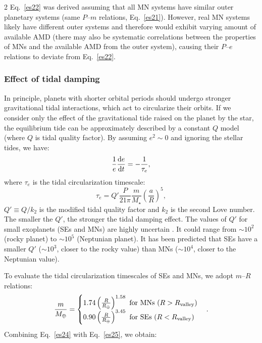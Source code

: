 \documentclass[10pt]{article}
\begin{document}
\begin{multicols}{2}
Eq.~\ref{es22} was derived assuming that all MN systems have similar outer planetary systems (same $P$--$m$ relations, Eq.~\ref{es21}).
However, real MN systems likely have different outer systems and therefore would exhibit varying amount of available AMD (there may also be systematic correlations between the properties of MNs and the available AMD from the outer system), causing their $P$--$e$ relations to deviate from Eq.~\ref{es22}.

\subsubsection*{\hypertarget{s3.3}{Effect of tidal damping}}
\noindent In principle, planets with shorter orbital periods should undergo stronger gravitational tidal interactions, which act to circularize their orbits.
If we consider only the effect of the gravitational tide raised on the planet by the star, the equilibrium tide can be approximately described by a constant $Q$ model (where $Q$ is tidal quality factor).
By assuming $e^2\sim0$ and ignoring the stellar tides, we have\cite{1966Icar....5..375G,2008ApJ...678.1396J}:
\begin{equation}
\label{es23}
{\frac{1}{e}} \frac{{\rm d}e}{{\rm d}t}  = -\frac{1}{\tau_e},
\end{equation}
where $\tau_e$ is the tidal circularization timescale:
\begin{equation}
\label{es24}
\tau_e = Q'{\frac{P}{21\pi}}\frac{m}{M_{\star}}\left({\frac{a}{R}}\right)^5,
\end{equation}
$Q'\equiv Q/k_2$ is the modified tidal quality factor and $k_2$ is the second Love number.
The smaller the $Q'$, the stronger the tidal damping effect.
The values of $Q'$ for small exoplanets (SEs and MNs) are highly uncertain  \cite{2017AJ....153...86M,2018AJ....155..157P,2023ApJ...958L..21L}.
It could range from $\sim 10^2$ (rocky planet)\cite{2016CeMDA.126..145L} to $\sim 10^5$ (Neptunian planet)\cite{2008Icar..193..267Z}.
It has been predicted that SEs have a smaller $Q'$ ($\sim 10^3$, closer to the rocky value) than MNs ($\sim 10^4$, closer to the Neptunian value)\cite{2023ApJ...958L..21L}.

To evaluate the tidal circularization timescales of SEs and MNs, we adopt $m$--$R$ relations\cite{2020A&A...634A..43O}:
\begin{equation}
\label{es25}
\frac{m}{M_\oplus}  =
\begin{cases}
1.74\left(\frac{R}{R_\oplus}\right)^{1.58}~{\rm for~MNs}  ~(R>R_{\rm  valley}) \\
0.90\left(\frac{R}{R_\oplus}\right)^{3.45}~{\rm for~SEs} ~(R<R_{\rm  valley})
\end{cases}
.
\end{equation}
Combining Eq.~\ref{es24} with Eq.~\ref{es25}, we obtain:
\end{multicols}
\end{document}
